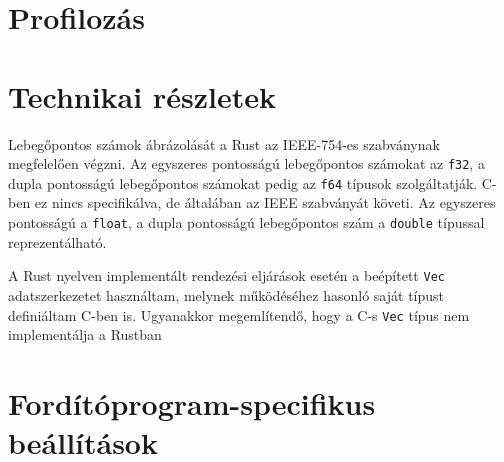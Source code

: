 
\section{Profilozás}
\section{Technikai részletek}
Lebegőpontos számok ábrázolását a Rust az IEEE-754-es szabványnak megfelelően végzni. Az egyszeres pontosságú lebegőpontos számokat az \lstinline{f32}, a dupla pontosságú lebegőpontos számokat pedig az \lstinline{f64} típusok szolgáltatják. C-ben ez nincs specifikálva, de általában az IEEE szabványát követi. Az egyszeres pontosságú a \lstinline{float}, a dupla pontosságú lebegőpontos szám a \lstinline{double} típussal reprezentálható.

A Rust nyelven implementált rendezési eljárások esetén a beépített \lstinline{Vec} adatszerkezetet használtam, melynek működéséhez hasonló saját típust definiáltam C-ben is. Ugyanakkor megemlítendő, hogy a C-s \lstinline{Vec} típus nem implementálja a Rustban
\section{Fordítóprogram-specifikus beállítások}
